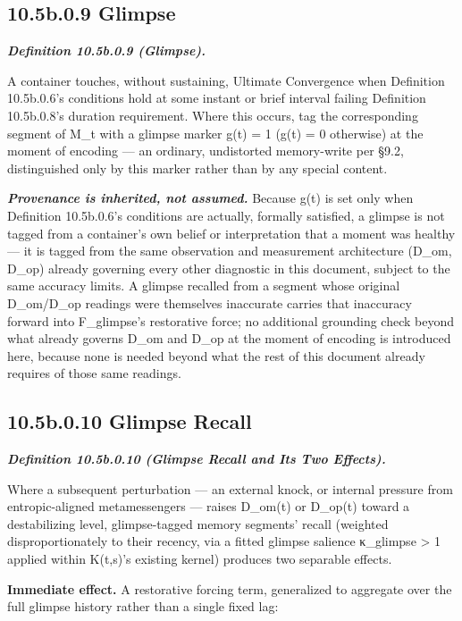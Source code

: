 \documentclass[
]{article}
\begin{document}
\hypertarget{b.0.9-glimpse}{%
\subsection{10.5b.0.9 Glimpse}\label{b.0.9-glimpse}}

\emph{\textbf{Definition 10.5b.0.9 (Glimpse).}}

A container touches, without sustaining, Ultimate Convergence when
Definition 10.5b.0.6's conditions hold at some instant or brief interval
failing Definition 10.5b.0.8's duration requirement. Where this occurs,
tag the corresponding segment of M\_t with a glimpse marker g(t) = 1
(g(t) = 0 otherwise) at the moment of encoding --- an ordinary,
undistorted memory-write per §9.2, distinguished only by this marker
rather than by any special content.

\emph{\textbf{Provenance is inherited, not assumed.}} Because g(t) is
set only when Definition 10.5b.0.6's conditions are actually, formally
satisfied, a glimpse is not tagged from a container's own belief or
interpretation that a moment was healthy --- it is tagged from the same
observation and measurement architecture (D\_om, D\_op) already
governing every other diagnostic in this document, subject to the same
accuracy limits. A glimpse recalled from a segment whose original
D\_om/D\_op readings were themselves inaccurate carries that inaccuracy
forward into F\_glimpse's restorative force; no additional grounding
check beyond what already governs D\_om and D\_op at the moment of
encoding is introduced here, because none is needed beyond what the rest
of this document already requires of those same readings.

\hypertarget{b.0.10-glimpse-recall}{%
\subsection{10.5b.0.10 Glimpse Recall}\label{b.0.10-glimpse-recall}}

\emph{\textbf{Definition 10.5b.0.10 (Glimpse Recall and Its Two
Effects).}}

Where a subsequent perturbation --- an external knock, or internal
pressure from entropic-aligned metamessengers --- raises D\_om(t) or
D\_op(t) toward a destabilizing level, glimpse-tagged memory segments'
recall (weighted disproportionately to their recency, via a fitted
glimpse salience κ\_glimpse \textgreater{} 1 applied within K(t,s)'s
existing kernel) produces two separable effects.

\textbf{Immediate effect.} A restorative forcing term, generalized to
aggregate over the full glimpse history rather than a single fixed lag:
\end{document}

